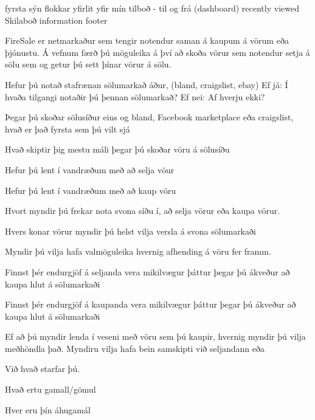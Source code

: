 fyrsta sýn
    flokkar
    yfirlit yfir mín tilboð - til og frá (dashboard)
    recently viewed
    Skilaboð
information footer

FireSale er netmarkaður sem tengir notendur saman á kaupum á vörum eða þjónustu. Á vefnum færð þú möguleika á því að skoða vörur sem notendur setja á sölu sem og getur þú sett þínar vörur á sölu. 


Hefur þú notað stafrænan sölumarkað áður, (bland, craigslist, ebay) 
Ef já:
    Í hvaða tilgangi notaðir þú þennan sölumarkað?
Ef nei:
    Af hverju ekki?

Þegar þú skoðar sölusíður eins og bland, Facebook marketplace eða craigslist, hvað er það fyrsta sem þú vilt sjá

Hvað skiptir þig mestu máli þegar þú skoðar vöru á sölusíðu

Hefur þú lent í vandræðum með að selja vöur

Hefur þú lent í vandræðum með að kaup vöru

Hvort myndir þú frekar nota svona síðu í, að selja vörur eða kaupa vörur.

Hvers konar vörur myndir þú helst vilja versla á svona sölumarkaði 

Myndir þú vilja hafa valmöguleika hvernig afhending á vöru fer framm.

Finnst þér endurgjöf á seljanda vera mikilvægur þáttur þegar þú ákveður að kaupa hlut á sölumarkaði

Finnst þér endurgjöf á kaupanda vera mikilvægur þáttur þegar þú ákveður að kaupa hlut á sölumarkaði

Ef að þú myndir lenda í veseni með vöru sem þú kaupir, hvernig myndir þú vilja meðhöndla það. Myndiru vilja hafa bein samskipti við seljandann eða 

Við hvað starfar þú.

Hvað ertu gamall/gömul

Hver eru þín áhugamál 